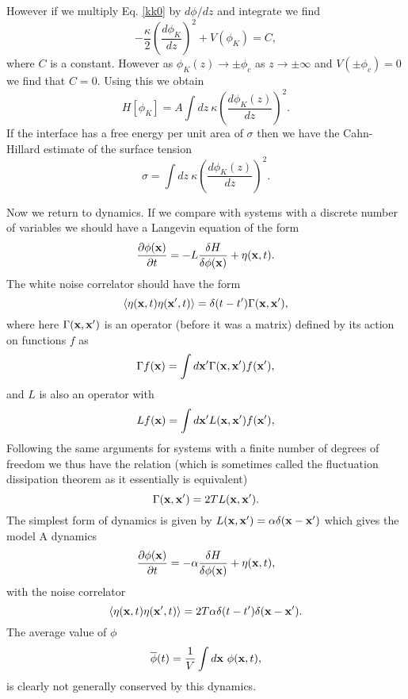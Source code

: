 \documentclass[11pt]{report}
\begin{document}
However if we multiply Eq. \eqref{kk0} by $d\phi/dz$ and integrate we find
\begin{equation}
-\frac{\kappa}{2} (\frac{d\phi_K}{dz})^2 + V(\phi_K) = C,
\end{equation}
where $C$ is a constant. However as $\phi_K(z)\to \pm \phi_c$ as $z\to \pm \infty$ and $V(\pm\phi_c) =0$ we find that $C=0$. Using this we obtain 
\begin{equation}
H[\phi_K]=  A\int dz\  {\kappa}\left(\frac{d\phi_K(z)}{dz}\right)^2 .
\end{equation}
If the interface has a free energy per unit area of $\sigma$ then we have the Cahn-Hillard estimate of the surface tension 
\begin{equation}
\sigma=  \int dz\  {\kappa}\left(\frac{d\phi_K(z)}{dz}\right)^2 .\label{CHST}
\end{equation}

Now we return to dynamics. If we compare with systems with a discrete number of variables we
should have a Langevin equation of the form
\begin{equation}
\frac{\partial \phi({\bf x})}{\partial t}= -L \frac{\delta H}{\delta \phi({\bf x})} + \eta({\bf x},t).
\end{equation}
The white noise correlator should have the form
\begin{equation}
\langle \eta({\bf x},t)\eta({\bf x}',t)\rangle =\delta(t-t')\Gamma({\bf x},{\bf x'}),
\end{equation}
where here  $\Gamma({\bf x},{\bf x'})$ is an operator (before it was a matrix) defined by its action on functions $f$ as
\begin{equation}
\Gamma f({\bf x}) = \int d{\bf x}' \Gamma({\bf x},{\bf x}')f({\bf x}'),
\end{equation}
and $L$ is also an operator with 
\begin{equation}
L f({\bf x}) = \int d{\bf x}' L({\bf x},{\bf x}')f({\bf x}'),
\end{equation}
Following the same arguments for systems with a finite number of degrees of freedom we thus have the relation (which is sometimes called the fluctuation dissipation theorem as it essentially is equivalent)
\begin{equation} 
\Gamma({\bf x},{\bf x}') =2T L({\bf x},{\bf x}').
\end{equation}
The simplest form of dynamics is given by $L({\bf x},{\bf x}')=\alpha\delta({\bf x}-{\bf x}')$ which gives the model A dynamics
\begin{equation}
\frac{\partial \phi({\bf x})}{\partial t}= -\alpha \frac{\delta H}{\delta \phi({\bf x})} + \eta({\bf x},t),\label{MA}
\end{equation}
with the noise correlator
\begin{equation}
\langle \eta({\bf x},t)\eta({\bf x}',t)\rangle =2T \alpha \delta(t-t')\delta({\bf x}-{\bf x'}).
\end{equation}
The average value of $\phi$ 
\begin{equation}
\overline \phi(t) = \frac{1}{V}\int d{\bf x}\  \phi({\bf x},t),
\end{equation}
is clearly not generally conserved by this dynamics.
\end{document}

